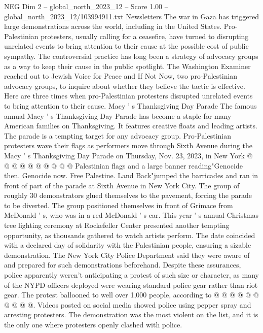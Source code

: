 \begin{textsample}{NEG Dim 2 – global\_north\_2023\_12 – Score 1.00 – global\_north\_2023\_12/103994911.txt}  \label{ex:f2_neg_336}
Newsletters The war in Gaza has triggered large demonstrations across the world, including in the United States.
Pro-Palestinian protesters, usually calling for a ceasefire, have turned to disrupting unrelated events to bring attention to their cause at the possible cost of public sympathy.
The controversial practice has long been a strategy of advocacy groups as a way to keep their cause in the public spotlight.
The Washington Examiner reached out to Jewish Voice for Peace and If Not Now, two pro-Palestinian advocacy groups, to inquire about whether they believe the tactic is effective.
Here are three times when pro-Palestinian protesters disrupted unrelated events to bring attention to their cause.
Macy ' s Thanksgiving Day Parade The famous annual Macy ' s Thanksgiving Day Parade has become a staple for many American families on Thanksgiving.
It features creative floats and leading artists.
The parade is a tempting target for any advocacy group.
Pro-Palestinian protesters wave their flags as performers move through Sixth Avenue during the Macy ' s Thanksgiving Day Parade on Thursday, Nov. 23, 2023, in New York @ @ @ @ @ @ @ @ @ @ Palestinian flags and a large banner reading"Genocide then.
Genocide now.
Free Palestine.
Land Back"jumped the barricades and ran in front of part of the parade at Sixth Avenue in New York City.
The group of roughly 30 demonstrators glued themselves to the pavement, forcing the parade to be diverted.
The group positioned themselves in front of Grimace from McDonald ' s, who was in a red McDonald ' s car.
This year ' s annual Christmas tree lighting ceremony at Rockefeller Center presented another tempting opportunity, as thousands gathered to watch artists perform.
The date coincided with a declared day of solidarity with the Palestinian people, ensuring a sizable demonstration.
The New York City Police Department said they were aware of and prepared for such demonstrations beforehand.
Despite these assurances, police apparently weren't anticipating a protest of such size or character, as many of the NYPD officers deployed were wearing standard police gear rather than riot gear.
The protest ballooned to well over 1,000 people, according to @ @ @ @ @ @ @ @ @ @.
Videos posted on social media showed police using pepper spray and arresting protesters.
The demonstration was the most violent on the list, and it is the only one where protesters openly clashed with police.

\end{textsample}
